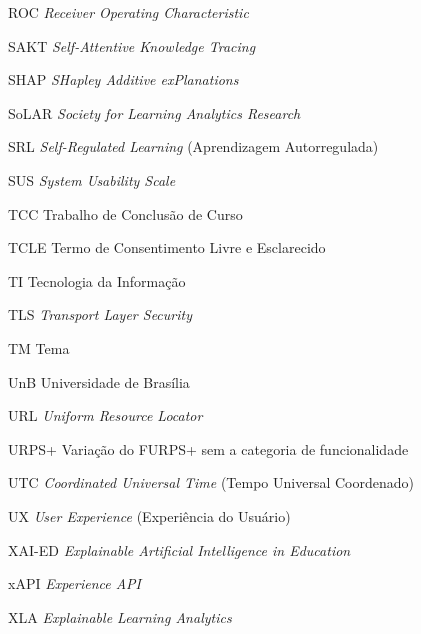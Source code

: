 \begin{siglas}
  \item[ROC] \textit{Receiver Operating Characteristic}
  \item[SAKT] \textit{Self-Attentive Knowledge Tracing}
  \item[SHAP] \textit{SHapley Additive exPlanations}
  \item[SoLAR] \textit{Society for Learning Analytics Research}
  \item[SRL] \textit{Self-Regulated Learning} (Aprendizagem Autorregulada)
  \item[SUS] \textit{System Usability Scale}
  \item[TCC] Trabalho de Conclusão de Curso
  \item[TCLE] Termo de Consentimento Livre e Esclarecido
  \item[TI] Tecnologia da Informação
  \item[TLS] \textit{Transport Layer Security}
  \item[TM] Tema
  \item[UnB] Universidade de Brasília
  \item[URL] \textit{Uniform Resource Locator}
  \item[URPS+] Variação do FURPS+ sem a categoria de funcionalidade
  \item[UTC] \textit{Coordinated Universal Time} (Tempo Universal Coordenado)
  \item[UX] \textit{User Experience} (Experiência do Usuário)
  \item[XAI-ED] \textit{Explainable Artificial Intelligence in Education}
  \item[xAPI] \textit{Experience API}
  \item[XLA] \textit{Explainable Learning Analytics}
\end{siglas}
